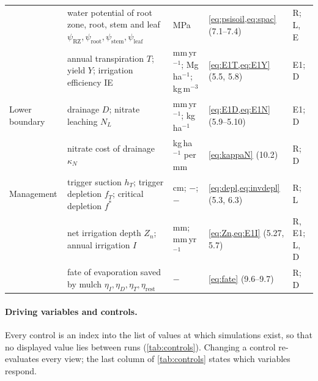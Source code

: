 \documentclass[preprint,12pt]{elsarticle}
\begin{document}
{\begin{longtable}{>{\raggedright\arraybackslash}p{2.3cm}>{\raggedright\arraybackslash}p{3.8cm}>{\raggedright\arraybackslash}p{1.8cm}>{\raggedright\arraybackslash}p{4.0cm}>{\raggedright\arraybackslash}p{1.9cm}}
 & water potential of root zone, root, stem and leaf $\psi_{\mathrm{RZ}},\psi_{\mathrm{root}},\psi_{\mathrm{stem}},\psi_{\mathrm{leaf}}$ & MPa & \cref{eq:psisoil,eq:spac} (7.1--7.4) & R; L, E\\
 & annual transpiration $T$; yield $Y$; irrigation efficiency IE & mm\,yr$^{-1}$; Mg\,ha$^{-1}$; kg\,m$^{-3}$ & \cref{eq:E1T,eq:E1Y} (5.5, 5.8) & E1; D\\
Lower boundary & drainage $D$; nitrate leaching $N_L$ & mm\,yr$^{-1}$; kg\,ha$^{-1}$ & \cref{eq:E1D,eq:E1N} (5.9--5.10) & E1; D\\
 & nitrate cost of drainage $\kappa_N$ & kg\,ha$^{-1}$ per mm & \cref{eq:kappaN} (10.2) & R; D\\
Management & trigger suction $h_T$; trigger depletion $f_T$; critical depletion $f^\ast$ & cm; $-$; $-$ & \cref{eq:depl,eq:invdepl} (5.3, 6.3) & R; L\\
 & net irrigation depth $Z_n$; annual irrigation $I$ & mm; mm\,yr$^{-1}$ & \cref{eq:Zn,eq:E1I} (5.27, 5.7) & R, E1; L, D\\
 & fate of evaporation saved by mulch $\eta_I,\eta_D,\eta_T,\eta_{\mathrm{rest}}$ & $-$ & \cref{eq:fate} (9.6--9.7) & R; D\\\bottomrule
\end{longtable}}

\paragraph{Driving variables and controls.}
\label{sec:sys-controls}
Every control is an index into the list of values at which simulations exist, so that no displayed value lies between runs (\cref{tab:controls}). Changing a control re-evaluates every view; the last column of \cref{tab:controls} states which variables respond.
\end{document}
